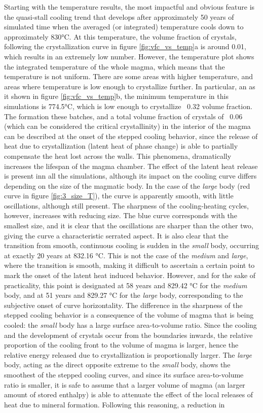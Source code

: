 Starting with the temperature results, the most impactful and obvious feature is the quasi-stall cooling trend that develops after approximately 50 years of simulated time when the averaged (or integrated) temperature cools down to approximately 830°C. At this temperature, the volume fraction of crystals, following the crystallization curve in figure \ref{fig:vfc_vs_temp}a is around 0.01, which results in an extremely low number. However, the temperature plot shows the integrated temperature of the whole magma, which means that the temperature is not uniform. There are some areas with higher temperature, and areas where temperature is low enough to crystallize further. In particular, an as it shown in figure \ref{fig:vfc_vs_temp}b, the minimum temperature in this simulations is 774.5°C, which is low enough to crystallize ~0.32 volume fraction. The formation these batches, and a total volume fraction of crystals of ~0.06 (which can be considered the critical crystallinity) in the interior of the magma can be described at the onset of the stepped cooling behavior, since the release of heat due to crystallization (latent heat of phase change) is able to partially compensate the heat lost across the walls. This phenomena, dramatically increases the lifespan of the magma chamber. The effect of the latent heat release is present inn all the simulations, although its impact on the cooling curve differs depending on the size of the magmatic body. In the case of the \textit{large} body (red curve in figure \ref{fig:3_size_T}), the curve is apparently smooth, with little oscillations, although still present. The sharpness of the cooling-heating cycles, however, increases with reducing size. The blue curve corresponds with the smallest size, and it is clear that the oscillations are sharper than the other two, giving the curve a characteristic serrated aspect. It is also clear that the transition from smooth, continuous cooling is sudden in the \textit{small} body, occurring at exactly 20 years at 832.16 °C. This is not the case of the \textit{medium} and \textit{large}, where the transition is smooth, making it difficult to ascertain a certain point to mark the onset of the latent heat induced behavior. However, and for the sake of practicality, this point is designated at 58 years and 829.42 °C for the \textit{medium} body, and at 51 years and 829.27 °C for the \textit{large} body, corresponding to the subjective onset of curve horizontality. The difference in the sharpness of the stepped cooling behavior is a consequence of the volume of magma that is being cooled: the \textit{small} body has a large surface area-to-volume ratio. Since the cooling and the development of crystals occur from the boundaries inwards, the relative proportion of the cooling front to the volume of magma is larger, hence the relative energy released due to crystallization is proportionally larger. The \textit{large} body, acting as the direct opposite extreme to the \textit{small} body, shows the smoothest of the stepped cooling curves, and since its surface area-to-volume ratio is smaller, it is safe to assume that a larger volume of magma (an larger amount of stored enthalpy) is able to attenuate the effect of the local releases of heat due to mineral formation. Following this reasoning, a reduction in 